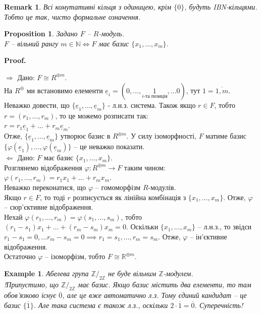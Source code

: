 \documentclass[a4paper, 10pt]{article}
\makeatletter
\def\rightproof{$\boxed{\Rightarrow}$ }
\def\leftproof{$\boxed{\Leftarrow}$ }
\theoremstyle{theoremdd}
\theoremstyle{theoremdd}
\theoremstyle{theoremdd}
\theoremstyle{theoremdd}
\theoremstyle{theoremdd}
\newtheorem{example}[theorem]{Example}
\theoremstyle{theoremdd}
\theoremstyle{theoremdd}
\theoremstyle{theoremdd}
\theoremstyle{theoremdd}
\newtheorem{proposition}[theorem]{Proposition}
\theoremstyle{theoremdd}
\theoremstyle{theoremdd}
\newtheorem{remark}[theorem]{Remark}
\theoremstyle{theoremdd}
\theoremstyle{theoremdd}
\theoremstyle{theoremdd}
\theoremstyle{theoremdd}
\renewenvironment{proof}[1][Proof.\\]{\par
\pushQED{\hfill \qed}%
\normalfont \topsep6\p@\@plus6\p@\relax
\trivlist
\item\relax
{\bfseries
#1\@addpunct{.}}\hspace\labelsep\ignorespaces
}{%
\popQED\endtrivlist\@endpefalse
}
\makeatother
\begin{document}
\begin{remark}
Всі комутативні кільця з одиницею, крім $\{0\}$, будуть IBN-кільцями. Тобто це так, чисто формальне означення.
\end{remark}

\begin{proposition}
Задано $F$ -- $R$-модуль.\\
$F$ -- вільний рангу $m \in \mathbb{N} \iff F$ має базис $\{x_1,\dots,x_m\}$.
\end{proposition}

\begin{proof}
\rightproof Дано: $F \cong R^{\oplus m}$. \\
На $R^{\oplus}$ ми встановимо елементи $\underline{e}_i = (0,\dots,\underset{i\text{-та позиція}}{1}, \dots 0)$, тут $1 = \overline{1,m}$. Неважко довести, що $\{\underline{e}_1,\dots,\underline{e}_m\}$ - л.н.з. система. Також якщо $r \in F$, тобто $r = (r_1,\dots,r_m)$, то це можемо розписати так:\\
$r = r_1 \underline{e}_1 + \dots + r_m \underline{e}_m$.\\
Отже, $\{\underline{e}_1,\dots,\underline{e}_m\}$ утворює базис в $R^{\oplus m}$. У силу ізоморфності, $F$ матиме базис $\{\varphi(\underline{e}_1),\dots,\varphi(\underline{e}_m)\}$ -- це неважко показати.
\bigskip \\
\leftproof Дано: $F$ має базис $\{x_1,\dots,x_m\}$. \\
Розглянемо відображення $\varphi \colon R^{\oplus m} \to F$ таким чином:\\
$\varphi(r_1,\dots,r_m) = r_1x_1 + \dots + r_m x_m$.\\
Неважко переконатися, що $\varphi$ -- гомоморфізм $R$-модулів.\\
Якщо $r \in F$, то тоді $r$ розписується як лінійна комбінація з $\{x_1,\dots,x_m\}$. Отже, $\varphi$ -- сюр'єктивне відображення.\\
Нехай $\varphi(r_1,\dots,r_m) = \varphi(s_1,\dots,s_m)$, тобто $(r_1-s_1)x_1 + \dots + (r_m-s_m)x_m = 0$. Оскільки $\{x_1,\dots,x_m\}$ -- л.н.з., то звідси $r_1-s_1 = 0,\dots r_m-s_m=0 \implies r_1 = s_1, \dots, r_m = s_m$. Отже, $\varphi$ -- ін'єктивне відображення.\\
Остаточно $\varphi$ -- ізоморфізм, тобто $F \cong \mathbb{R}^{\oplus m}$.
\end{proof}

\begin{example}
Абелева група $\mathbb{Z}/_{2 \mathbb{Z}}$ не буде вільним $\mathbb{Z}$-модулем.\\
!Припустимо, що $\mathbb{Z}/_{2 \mathbb{Z}}$ має базис. Якщо базис містить два елементи, то там обов'язково існує $\overline{0}$, але це вже автоматично л.з. Тому єдиний кандидат -- це базис $\{\overline{1}\}$. Але така система є також л.з., оскільки $2 \cdot \overline{1} = \overline{0}$. Суперечність!
\end{example}
\end{document}
